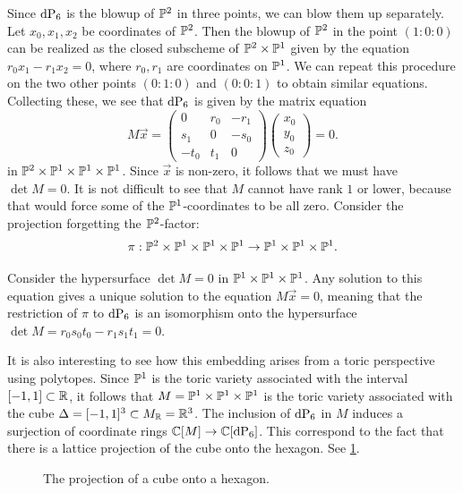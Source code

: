 Since $\dP6$ is the blowup of $\P^2$ in three points, we can blow them up separately. Let $x_0,x_1,x_2$ be coordinates of $\P^2$. Then the blowup of $\P^2$ in the point $(1:0:0)$ can be realized as the closed subscheme of $\P^2 \times \P^1$ given by the equation $r_0x_1-r_1x_2=0$, where $r_0,r_1$ are coordinates on $\P^1$. We can repeat this procedure on the two other points $(0:1:0)$ and $(0:0:1)$ to obtain similar equations. Collecting these, we see that $\dP6$ is given by the matrix equation
\[
M\vec x = 
\begin{pmatrix}
0 & r_0 & -r_1 \\
s_1 & 0 & -s_0 \\
-t_0 & t_1 & 0
\end{pmatrix}
\begin{pmatrix}
x_0 \\ y_0 \\ z_0
\end{pmatrix}= 0.
\]
in $\P^2 \times \P^1 \times \P^1 \times \P^1$. Since $\vec x$ is non-zero, it follows that we must have $\det M = 0$. It is not difficult to see that $M$ cannot have rank $1$ or lower, because that would force some of the $\P^1$-coordinates to be all zero. Consider the projection forgetting the $\P^2$-factor:
$$
\pi:\P^2 \times \P^1 \times \P^1 \times \P^1 \to \P^1 \times \P^1 \times \P^1.
$$

Consider the hypersurface $\det M = 0$ in $\P^1 \times \P^1 \times \P^1$. Any solution to this equation gives a unique solution to the equation $M \vec x = 0$, meaning that the restriction of $\pi$ to $\dP6$ is an isomorphism onto the hypersurface $\det M=r_0s_0t_0-r_1s_1t_1=0$. 

It is also interesting to see how this embedding arises from a toric perspective using polytopes. Since $\P^1$ is the toric variety associated with the interval $[-1,1] \subset \R$, it follows that $M = \P^1 \times \P^1 \times \P^1$ is the toric variety associated with the cube $\Delta = [-1,1]^3 \subset M_\R = \R^3$. The inclusion of $\dP6$ in $M$ induces a surjection of coordinate rings $\C[M] \to \C[\dP6]$. This correspond to the fact that there is a lattice projection of the cube onto the hexagon. See \cref{fig:cube_projection}.

\begin{figure}
\centering 

\caption{The projection of a cube onto a hexagon.}
\label{fig:cube_projection}
\end{figure}

